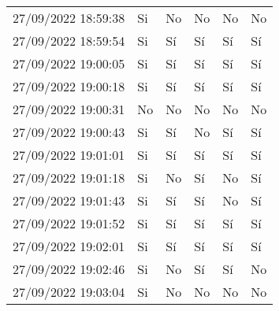 \begin{ThreePartTable}
\begin{longtable}{
  p{0.3125\lanscapetablewidth}
  p{0.125\lanscapetablewidth}
  p{0.1875\lanscapetablewidth}
  p{0.125\lanscapetablewidth}
  p{0.125\lanscapetablewidth}
  p{0.125\lanscapetablewidth}
}
  27/09/2022 18:59:38 & Si & No & No & No & No \\
  27/09/2022 18:59:54 & Si & Sí & Sí & Sí & Sí \\
  27/09/2022 19:00:05 & Si & Sí & Sí & Sí & Sí \\
  27/09/2022 19:00:18 & Si & Sí & Sí & Sí & Sí \\
  27/09/2022 19:00:31 & No & No & No & No & No \\
  27/09/2022 19:00:43 & Si & Sí & No & Sí & Sí \\
  27/09/2022 19:01:01 & Si & Sí & Sí & Sí & Sí \\
  27/09/2022 19:01:18 & Si & No & Sí & No & Sí \\
  27/09/2022 19:01:43 & Si & Sí & Sí & No & Sí \\
  27/09/2022 19:01:52 & Si & Sí & Sí & Sí & Sí \\
  27/09/2022 19:02:01 & Si & Sí & Sí & Sí & Sí \\
  27/09/2022 19:02:46 & Si & No & Sí & Sí & No \\
  27/09/2022 19:03:04 & Si & No & No & No & No \\
\end{longtable}
\end{ThreePartTable}